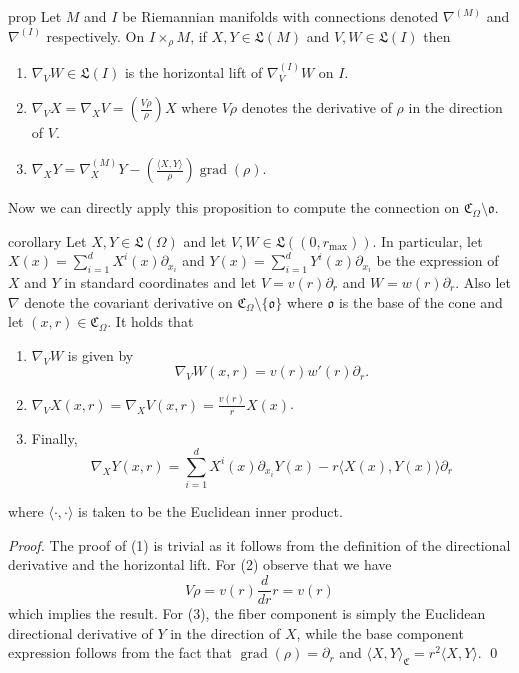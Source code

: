 \documentclass[11pt]{article}
\newcommand{\man}{M}
\begin{document}
\begin{restatable}{prop}{}
    Let $\man$ and $I$ be Riemannian manifolds with connections denoted $\nabla^{(\man)}$ and $\nabla^{(I)}$ respectively. On $I \times_\rho \man$, if $X, Y \in \mathfrak{L}(\man)$ and $V, W \in \mathfrak{L}(I)$ then
    \begin{enumerate}
        \item $\nabla_VW \in \mathfrak{L}(I)$ is the horizontal lift of $\nabla^{(I)}_VW$ on $I$.
        \item $\nabla_VX = \nabla_XV = \left(\frac{V\rho}{\rho}\right)X$ where $V\rho$ denotes the derivative of $\rho$ in the direction of $V$.
        \item $\nabla_XY = \nabla_X^{(\man)}Y - \left(\frac{\langle X, Y\rangle}{\rho}\right)\operatorname{grad}(\rho)$.
    \end{enumerate}
\end{restatable}
\noindent Now we can directly apply this proposition to compute the connection on $\mathfrak{C}_\Omega \setminus \mathfrak{o}.$ 

\begin{restatable}{corollary}{} \label{corollary: connection on cone}
    Let $X, Y \in \mathfrak{L}(\Omega)$ and let $V, W \in \mathfrak{L}((0, r_{\max}))$. In particular, let $X(x) = \sum_{i = 1}^d X^i(x)\partial_{x_i}$ and $Y(x) = \sum_{i = 1}^d Y^i(x)\partial_{x_i}$ be the expression of $X$ and $Y$ in standard coordinates and let $V = v(r)\partial_r$ and $W = w(r)\partial_r$. Also let $\nabla$ denote the covariant derivative on $\mathfrak{C}_\Omega \setminus \{\mathfrak{o}\}$ where $\mathfrak{o}$ is the base of the cone and let $(x,r) \in \mathfrak{C}_\Omega$. It holds that 
    \begin{enumerate}
        \item $\nabla_VW$ is given by 
        \[\nabla_VW(x,r) = v(r)w'(r)\partial_r.\]
        \item $\nabla_VX(x,r) = \nabla_XV(x,r) = \frac{v(r)}{r}X(x)$.
        \item Finally,
        \[\nabla_XY(x,r) = \sum_{i = 1}^dX^i(x) \partial_{x_i}Y(x)  - r\langle X(x), Y(x) \rangle\partial_r \]
    \end{enumerate}
    where $\langle\cdot, \cdot\rangle$ is taken to be the Euclidean inner product. 
\end{restatable}
\noindent \textit{Proof.} The proof of (1) is trivial as it follows from the definition of the directional derivative and the horizontal lift. For (2) observe that we have
\[V\rho = v(r)\frac{d}{d r}r = v(r)\]
which implies the result. For (3), the fiber component is simply the Euclidean directional derivative of $Y$ in the direction of $X$, while the base component expression follows from the fact that $\operatorname{grad}(\rho) = \partial_r$ and $\langle X, Y \rangle_{\mathfrak{C}} = r^2\langle X, Y\rangle$.  \qed{}
\end{document}
